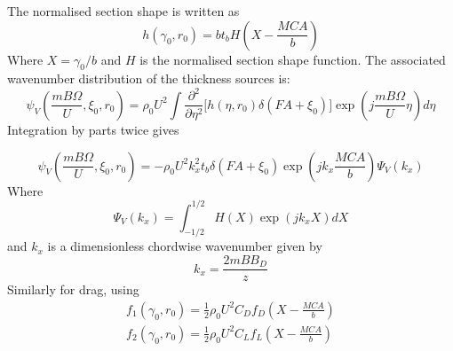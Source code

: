 \documentclass[8pt]{article}
\begin{document}
The normalised section shape is written as
\begin{equation}
   h(\gamma_0, r_0) = bt_b H\left(X - \frac{MCA}{b}\right) 
\end{equation}
Where $X = \gamma_0/b$ and $H$ is the normalised section shape function.
The associated wavenumber distribution of the thickness sources is:
\begin{equation}
    \psi_V\left( \frac{mB\Omega}{U}, \xi_0, r_0 \right) = \rho_0 U^2 \int \frac{\partial^2 }{\partial \eta^2} \bigg[ h(\eta, r_0) \delta(FA + \xi_0) \bigg] \exp\left( j \frac{mB\Omega}{U} \eta \right) d\eta
\end{equation}
Integration by parts twice gives

\begin{equation}
    \psi_V\left( \frac{mB\Omega}{U}, \xi_0, r_0 \right) = - \rho_0 U^2 k_x^2 t_b \delta(FA + \xi_0) \exp\left( j k_x \frac{MCA}{b} \right) \Psi_V(k_x)
\end{equation}
Where
\begin{equation}
    \Psi_V(k_x) = \int_{-1/2}^{1/2} H(X) \exp(jk_x X) dX
\end{equation}
and $k_x$ is a dimensionless chordwise wavenumber given by
\begin{equation}
    k_x = \frac{2mB B_D}{z}
\end{equation}
Similarly for drag, using
\begin{align}
    f_1(\gamma_0, r_0) = \frac{1}{2}\rho_0 U^2 C_D f_D \left(X - \frac{MCA}{b} \right) \\
    f_2(\gamma_0, r_0) = \frac{1}{2}\rho_0 U^2 C_L f_L \left(X - \frac{MCA}{b} \right)
\end{align}
\end{document}
